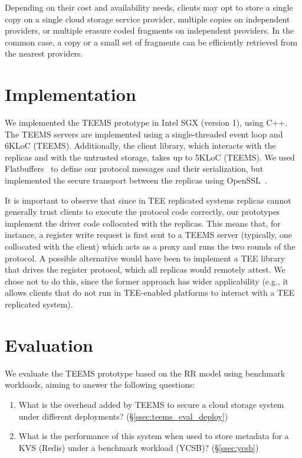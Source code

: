 Depending on their cost and availability needs, clients may opt to
store a single copy on a single cloud storage service provider,
multiple copies on independent providers, or multiple erasure coded
fragments on independent providers. In the common case, a copy or a
small set of fragments can be efficiently retrieved from the nearest
providers.


\section{Implementation}\label{sec:teems_impl}

We implemented the \ac{TEEMS} prototype in Intel SGX (version 1),
using C++. The \ac{TEEMS} servers are implemented using a
single-threaded event loop and 6KLoC (\ac{TEEMS}). Additionally,
the client library, which interacts with the replicas and with
the untrusted storage, takes up to 5KLoC (\ac{TEEMS}). We used
Flatbuffers~\cite{flatbuffers} to define our protocol messages
and their serialization, but implemented the secure transport
between the replicas using OpenSSL~\cite{openssl}.

It is important to observe that since in \ac{TEE} replicated
systems replicas cannot generally trust clients to execute the protocol
code correctly, our prototypes implement the driver code
collocated with the replicas. This means that, for instance, a
register write request is first sent to a \ac{TEEMS} server (typically, one
collocated with the client) which acts as a proxy and runs the
two rounds of the protocol. A possible alternative would have been
to implement a \ac{TEE} library that drives the register
protocol, which all replicas would remotely attest. We chose
not to do this, since the former approach has wider applicability
(e.g., it allows clients that do not run in \ac{TEE}-enabled
platforms to interact with a \ac{TEE} replicated system).

\section{Evaluation}\label{sec:teems_eval}


We evaluate the \ac{TEEMS} prototype based on the \ac{RR} model
using benchmark workloads, aiming to answer the following questions:

\begin{enumerate}
    \item What is the overhead added by \ac{TEEMS} to secure a cloud storage system under different
      deployments?  (\S\ref{ssec:teems_eval_deploy})
    \item What is the performance of this system  when used to store
      metadata for a \ac{KVS} (Redis) under a benchmark
        workload (\ac{YCSB})?
      (\S\ref{ssec:ycsb})
\end{enumerate}


